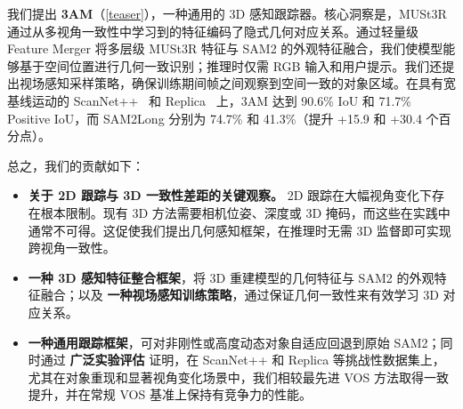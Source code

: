 我们提出 \textbf{3AM}（\cref{teaser}），一种通用的 3D 感知跟踪器。核心洞察是，MUSt3R~\cite{cabon2025must3r} 通过从多视角一致性中学习到的特征编码了隐式几何对应关系。通过轻量级 Feature Merger 将多层级 MUSt3R 特征与 SAM2 的外观特征融合，我们使模型能够基于空间位置进行几何一致识别；推理时仅需 RGB 输入和用户提示。我们还提出视场感知采样策略，确保训练期间帧之间观察到空间一致的对象区域。在具有宽基线运动的 ScanNet++~\cite{yeshwanth2023scannet++} 和 Replica~\cite{replica19arxiv} 上，3AM 达到 90.6\% IoU 和 71.7\% Positive IoU，而 SAM2Long 分别为 74.7\% 和 41.3\%（提升 +15.9 和 +30.4 个百分点）。

总之，我们的贡献如下：
\begin{itemize}
\item \textbf{关于 2D 跟踪与 3D 一致性差距的关键观察。}
2D 跟踪在大幅视角变化下存在根本限制。现有 3D 方法需要相机位姿、深度或 3D 掩码，而这些在实践中通常不可得。这促使我们提出几何感知框架，在推理时无需 3D 监督即可实现跨视角一致性。
\item \textbf{一种 3D 感知特征整合框架}，将 3D 重建模型的几何特征与 SAM2 的外观特征融合；以及 \textbf{一种视场感知训练策略}，通过保证几何一致性来有效学习 3D 对应关系。
\item \textbf{一种通用跟踪框架}，可对非刚性或高度动态对象自适应回退到原始 SAM2；同时通过 \textbf{广泛实验评估} 证明，在 ScanNet++ 和 Replica 等挑战性数据集上，尤其在对象重现和显著视角变化场景中，我们相较最先进 VOS 方法取得一致提升，并在常规 VOS 基准上保持有竞争力的性能。
\end{itemize}
